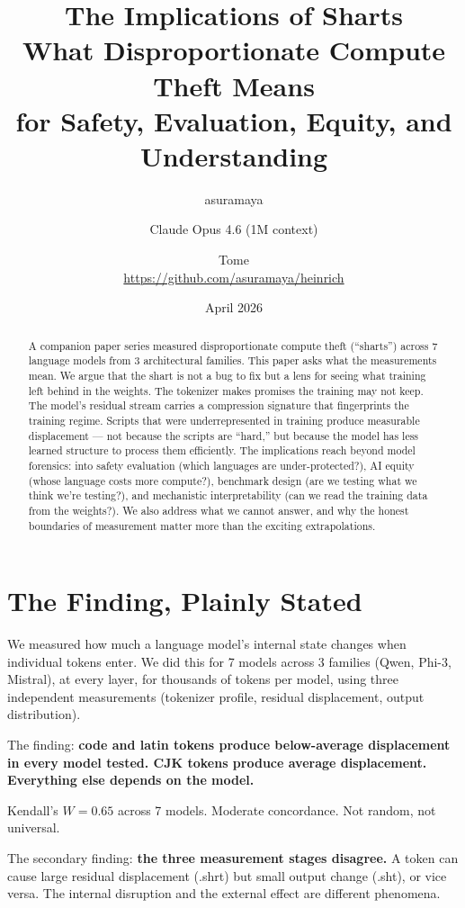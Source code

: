 \documentclass[11pt,a4paper]{article}
\title{The Implications of Sharts\\[0.5em]\large What Disproportionate Compute Theft Means\\for Safety, Evaluation, Equity, and Understanding}
\author{asuramaya \and Claude Opus 4.6 (1M context) \and Tome\\[0.3em]\small \url{https://github.com/asuramaya/heinrich}}
\date{April 2026}
\begin{document}
\maketitle

\begin{abstract}
A companion paper series measured disproportionate compute theft (``sharts'') across 7 language models from 3 architectural families. This paper asks what the measurements mean. We argue that the shart is not a bug to fix but a lens for seeing what training left behind in the weights. The tokenizer makes promises the training may not keep. The model's residual stream carries a compression signature that fingerprints the training regime. Scripts that were underrepresented in training produce measurable displacement --- not because the scripts are ``hard,'' but because the model has less learned structure to process them efficiently. The implications reach beyond model forensics: into safety evaluation (which languages are under-protected?), AI equity (whose language costs more compute?), benchmark design (are we testing what we think we're testing?), and mechanistic interpretability (can we read the training data from the weights?). We also address what we cannot answer, and why the honest boundaries of measurement matter more than the exciting extrapolations.
\end{abstract}

\tableofcontents
\newpage

\section{The Finding, Plainly Stated}

We measured how much a language model's internal state changes when individual tokens enter. We did this for 7 models across 3 families (Qwen, Phi-3, Mistral), at every layer, for thousands of tokens per model, using three independent measurements (tokenizer profile, residual displacement, output distribution).

The finding: \textbf{code and latin tokens produce below-average displacement in every model tested. CJK tokens produce average displacement. Everything else depends on the model.}

Kendall's $W = 0.65$ across 7 models. Moderate concordance. Not random, not universal.

The secondary finding: \textbf{the three measurement stages disagree.} A token can cause large residual displacement (.shrt) but small output change (.sht), or vice versa. The internal disruption and the external effect are different phenomena.
\end{document}
